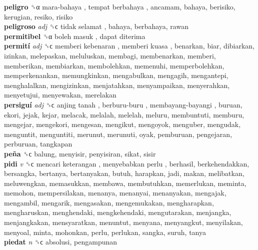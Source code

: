 \textbf{peligro} ␝α   mara-bahaya ,  tempat berbahaya , ancamam, bahaya, berisiko, kerugian, resiko, risiko  \\
\textbf{peligroso} \emph{adj}  ␝ϲ   tidak selamat , bahaya, berbahaya, rawan  \\
\textbf{permitibel} ␝α   boleh masuk ,  dapat diterima   \\
\textbf{permití} \emph{adj}  ␝ϲ   memberi kebenaran ,  memberi kuasa , benarkan, biar, dibiarkan, izinkan, melepaskan, meluluskan, membagi, membenarkan, memberi, memberikan, membiarkan, membolehkan, memenuhi, memperbolehkan, memperkenankan, memungkinkan, mengabulkan, mengagih, mengantepi, menghalalkan, mengizinkan, menjatahkan, menyampaikan, menyerahkan, menyetujui, menyewakan, merelakan  \\
\textbf{persiguí} \emph{adj}  ␝ϲ   anjing tanah ,  berburu-buru ,  membayang-bayangi , buruan, ekori, jejak, kejar, melacak, melalah, melelah, meluru, membuntuti, memburu, mengejar, mengekori, mengesan, mengikut, mengoyok, menguber, mengudak, menguntit, menguntiti, merunut, merunuti, oyak, pemburuan, pengejaran, perburuan, tangkapan  \\
\textbf{peña} ␝ϲ  balung, menyisir, penyisiran, sikat, sisir  \\
\textbf{pidi} \emph{v}  ␝ϲ   mencari keterangan ,  menyebabkan perlu , berhasil, berkehendakkan, bersangka, bertanya, bertanyakan, butuh, harapkan, jadi, makan, melibatkan, meluwengkan, memasukkan, membawa, membutuhkan, memerlukan, meminta, memohon, mempersilakan, menanya, menanyai, menanyakan, mengajak, mengambil, mengarik, mengasakan, mengemukakan, mengharapkan, mengharuskan, menghendaki, mengkehendaki, mengutarakan, menjangka, menjangkakan, mensyaratkan, menuntut, menyana, menyangkut, menyilakan, menyoal, minta, mohonkan, perlu, perlukan, sangka, suruh, tanya  \\
\textbf{piedat} \emph{n}  ␝ϲ  absolusi, pengampunan  \\
